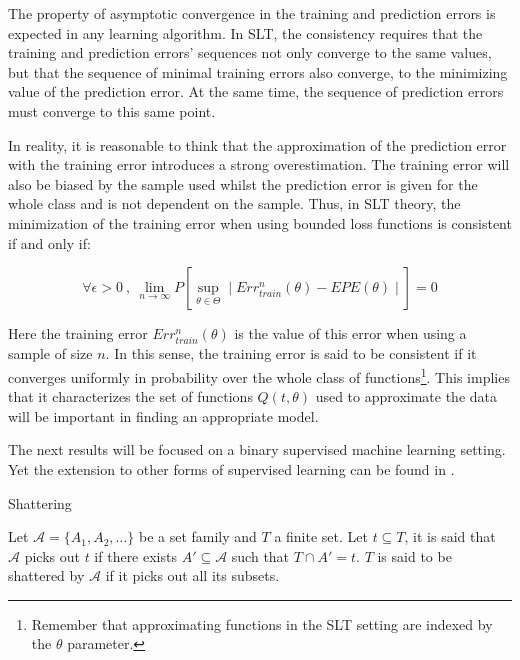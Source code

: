 The property of asymptotic convergence in the training and prediction errors is expected in any learning algorithm. In SLT, the consistency requires that the training and prediction errors' sequences not only converge to the same values, but that the sequence of minimal training errors also converge, to the minimizing value of the prediction error. At the same time, the sequence of prediction errors must converge to this same point.

In reality, it is reasonable to think that the approximation of the prediction error with the training error introduces a strong overestimation. The training error will also be biased by the sample used whilst the prediction error is given for the whole class and is not dependent on the sample. Thus, in SLT theory, the minimization of the training error when using bounded loss functions is consistent if and only if:


\begin{equation}
\forall \epsilon > 0 \ , \ \lim_{n\to\infty} P\left[ \sup_{\theta \in \Theta} \mid Err^{n}_{train}(\theta) - EPE(\theta) \mid \right] = 0 
\end{equation}

Here the training error $Err^{n}_{train}(\theta)$ is the value of this error when using a sample of size $n$. In this sense, the training error is said to be consistent if it converges uniformly in probability over the whole class of functions\footnote{Remember that approximating functions in the SLT setting are indexed by the $\theta$ parameter.}. This implies that it characterizes the set of functions $Q(t,\theta)$ used to approximate the data will be important in finding an appropriate model. %

The next results will be focused on a binary supervised machine learning setting. Yet the extension to other forms of supervised learning can be found in \textcite{cherkassky-learning2007}.

\begin{definition}{Shattering}

Let $\mathcal {A}= \{A_1,A_{2},\dots \}$ be a set family and $T$ a finite set. Let $t \subseteq T$, it is said that $\mathcal {A}$ picks out $t$ if there exists $A' \subseteq \mathcal {A} $ such that $ T \cap A' = t$. $T$ is said to be shattered by $\mathcal {A}$ if it picks out all its subsets.


\end{definition}

